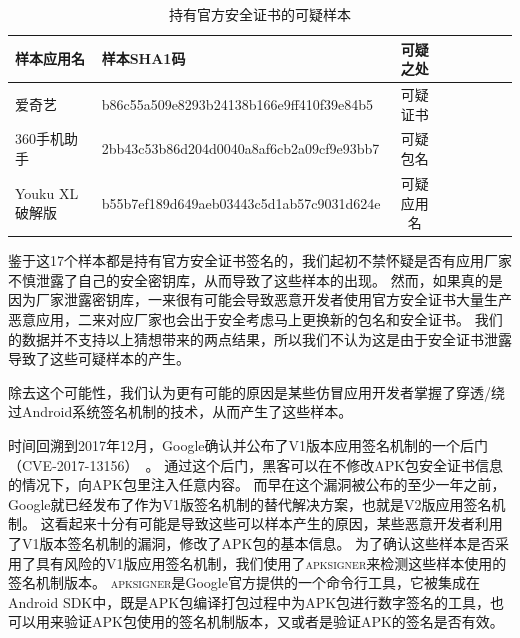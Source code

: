 \begin{table}[htbp]
	\renewcommand{\arraystretch}{1}
	\small
	\centering
  \setlength{\belowcaptionskip}{-10pt}
	\caption{持有官方安全证书的可疑样本}
	\begin{tabular}{l l c c c c c c}
		\toprule
		{\bf 样本应用名} & {\bf 样本SHA1码} & {\bf 可疑之处} \\
		\midrule
		爱奇艺 & b86c55a509e8293b24138b166e9ff410f39e84b5 & 可疑证书\\
		360手机助手 & 2bb43c53b86d204d0040a8af6cb2a09cf9e93bb7 & 可疑包名\\
		Youku XL 破解版 & b55b7ef189d649aeb03443c5d1ab57c9031d624e & 可疑应用名 \\
		\bottomrule
	\end{tabular}
	\label{table:suspicious_samples}
\end{table}

鉴于这17个样本都是持有官方安全证书签名的，我们起初不禁怀疑是否有应用厂家不慎泄露了自己的安全密钥库，从而导致了这些样本的出现。
然而，如果真的是因为厂家泄露密钥库，一来很有可能会导致恶意开发者使用官方安全证书大量生产恶意应用，二来对应厂家也会出于安全考虑马上更换新的包名和安全证书。
我们的数据并不支持以上猜想带来的两点结果，所以我们不认为这是由于安全证书泄露导致了这些可疑样本的产生。

除去这个可能性，我们认为更有可能的原因是某些仿冒应用开发者掌握了穿透/绕过Android系统签名机制的技术，从而产生了这些样本。

时间回溯到2017年12月，Google确认并公布了V1版本应用签名机制的一个后门（CVE-2017-13156）~\cite{android_security_bulletin}。
通过这个后门，黑客可以在不修改APK包安全证书信息的情况下，向APK包里注入任意内容。
而早在这个漏洞被公布的至少一年之前，Google就已经发布了作为V1版签名机制的替代解决方案，也就是V2版应用签名机制。
这看起来十分有可能是导致这些可以样本产生的原因，某些恶意开发者利用了V1版本签名机制的漏洞，修改了APK包的基本信息。
为了确认这些样本是否采用了具有风险的V1版应用签名机制，我们使用了\textsc{apksigner}来检测这些样本使用的签名机制版本。
\textsc{apksigner}是Google官方提供的一个命令行工具，它被集成在Android SDK中，既是APK包编译打包过程中为APK包进行数字签名的工具，也可以用来验证APK包使用的签名机制版本，又或者是验证APK的签名是否有效。

